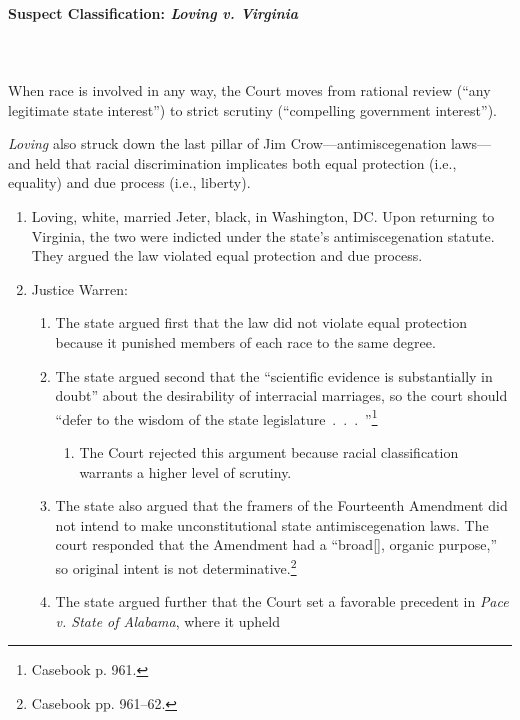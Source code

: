 \paragraph{Suspect Classification: \emph{Loving v. Virginia}}
~\\\\
When race is involved in any way, the Court moves from rational review (``any 
legitimate state interest'') to strict scrutiny (``compelling government 
interest'').

\emph{Loving} also struck down the last pillar of Jim Crow---antimiscegenation 
laws---and held that racial discrimination implicates both equal protection 
(i.e., equality) and due process (i.e., liberty).

\begin{enumerate}
    \item Loving, white, married Jeter, black, in Washington, DC. Upon 
    returning to Virginia, the two were indicted under the state's 
    antimiscegenation statute. They argued the law violated equal protection 
    and due process.
    \item Justice Warren:
    \begin{enumerate}
        \item The state argued first that the law did not violate equal 
        protection because it punished members of each race to the same 
        degree.
        \item The state argued second that the ``scientific evidence is 
        substantially in doubt'' about the desirability of interracial 
        marriages, so the court should ``defer to the wisdom of the state 
        legislature~.~.~.~''\footnote{Casebook p. 961.}
        \begin{enumerate}
            \item The Court rejected this argument because racial 
            classification warrants a higher level of scrutiny.
        \end{enumerate}
        \item The state also argued that the framers of the Fourteenth 
        Amendment did not intend to make unconstitutional state 
        antimiscegenation laws. The court responded that the Amendment had a 
        ``broad[], organic purpose,'' so original intent is not 
        determinative.\footnote{Casebook pp. 961--62.}
        \item The state argued further that the Court set a favorable 
        precedent in \emph{Pace v. State of Alabama}, where it upheld 

\end{enumerate}
\end{enumerate}
